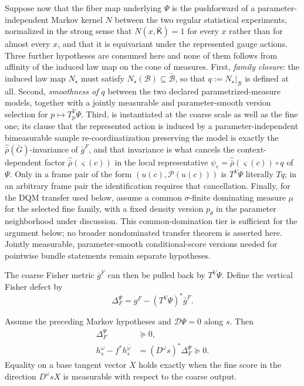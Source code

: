 Suppose now that the fiber map underlying $\Psi$ is the pushforward of a
parameter-independent Markov kernel $N$ between the two regular statistical
experiments, normalized in the strong sense that $N(x,\bar{\mathsf K})=1$ for
every $x$ rather than for almost every $x$, and that it is equivariant under
the represented gauge actions.  Three further hypotheses are consumed here and
none of them follows from affinity of the induced law map on the cone of
measures.  First, \emph{family closure}: the induced law map $N_\star$ must
satisfy $N_\star(\mathcal B)\subseteq\bar{\mathcal B}$, so that
$q:=N_\star|_{\mathcal B}$ is defined at all.  Second, \emph{smoothness of
$q$} between the two declared parametrized-measure models, together with a
jointly measurable and parameter-smooth version selection for
$p\mapsto T^V_p\Psi$.  Third,  is instantiated at
the coarse scale as well as the fine one; its clause that the represented
action is induced by a parameter-independent bimeasurable sample
re-coordinatization preserving the model is exactly the
$\widehat{\bar\rho}(\bar G)$-invariance of $\bar g^F$, and that invariance is
what cancels the context-dependent factor $\widehat{\bar\rho}(\varsigma(c))$ in
the local representative $\psi_c=\widehat{\bar\rho}(\varsigma(c))\circ q$ of
$\Psi$.  Only in a frame pair of the form $(u(c),\mathcal P(u(c)))$ is
$T^V\Psi$ literally $Tq$; in an arbitrary frame pair the identification
  requires that cancellation.  Finally, for the DQM transfer used below, assume
  a common $\sigma$-finite dominating measure $\mu$ for the selected fine
  family, with a fixed density version $p_\theta$ in the parameter neighborhood
  under discussion.  This common-domination tier is sufficient for the argument
  below; no broader nondominated transfer theorem is asserted here.  Jointly
  measurable, parameter-smooth conditional-score versions needed for pointwise
   bundle statements remain separate hypotheses. 

The coarse Fisher metric $\bar g^F$ can then be pulled back by $T^V\Psi$. Define
the vertical Fisher defect by
\begin{equation}
\Delta_F^\Psi
=g^F-(T^V\Psi)^*\bar g^F.
\label{eq:pb-vertical-fisher-defect}
\end{equation}

Assume the preceding Markov hypotheses and
$\mathcal D\Psi=0$ along $s$.  Then
\begin{align}
\Delta_F^\Psi
&\succeq0,
\label{eq:pb-fisher-defect-positive}\\
h_s^\omega-f^*h_{\bar s}^{\bar\omega}
&=(D^\omega s)^*\Delta_F^\Psi\succeq0.
\label{eq:pb-pullback-fisher-contraction}
\end{align}
Equality on a base tangent vector $X$ holds exactly when the fine score in
the direction $D^\omega sX$ is measurable with respect to the coarse output.

